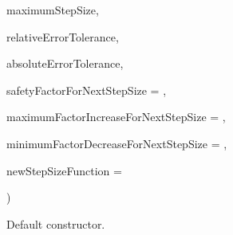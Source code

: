 {\begin{DoxyParamCaption}
\item[{const Independent\+Variable\+Type}]{maximum\+Step\+Size, }
\item[{const State\+Type \&}]{relative\+Error\+Tolerance, }
\item[{const State\+Type \&}]{absolute\+Error\+Tolerance, }
\item[{const Time\+Step\+Type}]{safety\+Factor\+For\+Next\+Step\+Size = {}, }
\item[{const Time\+Step\+Type}]{maximum\+Factor\+Increase\+For\+Next\+Step\+Size = {}, }
\item[{const Time\+Step\+Type}]{minimum\+Factor\+Decrease\+For\+Next\+Step\+Size = {}, }
\item[{const {\bf New\+Step\+Size\+Function} \&}]{new\+Step\+Size\+Function = {}}
\end{DoxyParamCaption}
)\hspace{0.3cm}{\ttfamily [inline]}}\hypertarget{classtudat_1_1numerical__integrators_1_1RungeKuttaVariableStepSizeIntegrator_ac50cd2ef741a2efb8803cff8b5d0283d}{}\label{classtudat_1_1numerical__integrators_1_1RungeKuttaVariableStepSizeIntegrator_ac50cd2ef741a2efb8803cff8b5d0283d}


Default constructor. 

